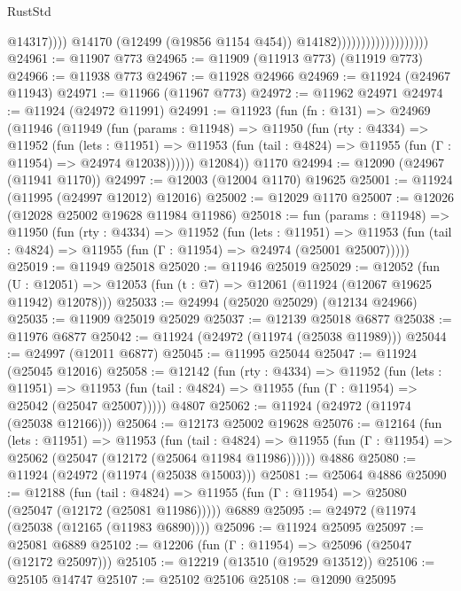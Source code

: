 \begin{lexlean}{RustStd}
\begin{coremodule}
                                                  @14317))))
                                          @14170
                                          (@12499 (@19856 @1154 @454))
                                          @14182)))))))))))))))))))
@24961 := @11907 @773
@24965 := @11909 (@11913 @773) (@11919 @773)
@24966 := @11938 @773
@24967 := @11928 @24966
@24969 := @11924 (@24967 @11943)
@24971 := @11966 (@11967 @773)
@24972 := @11962 @24971
@24974 := @11924 (@24972 @11991)
@24991 := @11923
    (fun (fn : @131) =>
    @24969
      (@11946
        (@11949
          (fun (params : @11948) =>
          @11950
            (fun (rty : @4334) =>
            @11952
              (fun (lets : @11951) =>
              @11953 (fun (tail : @4824) => @11955 (fun (Γ : @11954) => @24974 @12038))))))
        @12084))
    @1170
@24994 := @12090 (@24967 (@11941 @1170))
@24997 := @12003 (@12004 @1170) @19625
@25001 := @11924 (@11995 (@24997 @12012) @12016)
@25002 := @12029 @1170
@25007 := @12026 (@12028 @25002 @19628 @11984 @11986)
@25018 := fun (params : @11948) =>
  @11950
    (fun (rty : @4334) =>
    @11952
      (fun (lets : @11951) =>
      @11953 (fun (tail : @4824) => @11955 (fun (Γ : @11954) => @24974 (@25001 @25007)))))
@25019 := @11949 @25018
@25020 := @11946 @25019
@25029 := @12052
    (fun (U : @12051) => @12053 (fun (t : @7) => @12061 (@11924 (@12067 @19625 @11942) @12078)))
@25033 := @24994 (@25020 @25029) (@12134 @24966)
@25035 := @11909 @25019 @25029
@25037 := @12139 @25018 @6877
@25038 := @11976 @6877
@25042 := @11924 (@24972 (@11974 (@25038 @11989)))
@25044 := @24997 (@12011 @6877)
@25045 := @11995 @25044
@25047 := @11924 (@25045 @12016)
@25058 := @12142
    (fun (rty : @4334) =>
    @11952
      (fun (lets : @11951) =>
      @11953 (fun (tail : @4824) => @11955 (fun (Γ : @11954) => @25042 (@25047 @25007)))))
    @4807
@25062 := @11924 (@24972 (@11974 (@25038 @12166)))
@25064 := @12173 @25002 @19628
@25076 := @12164
    (fun (lets : @11951) =>
    @11953
      (fun (tail : @4824) =>
      @11955 (fun (Γ : @11954) => @25062 (@25047 (@12172 (@25064 @11984 @11986))))))
    @4886
@25080 := @11924 (@24972 (@11974 (@25038 @15003)))
@25081 := @25064 @4886
@25090 := @12188
    (fun (tail : @4824) => @11955 (fun (Γ : @11954) => @25080 (@25047 (@12172 (@25081 @11986)))))
    @6889
@25095 := @24972 (@11974 (@25038 (@12165 (@11983 @6890))))
@25096 := @11924 @25095
@25097 := @25081 @6889
@25102 := @12206 (fun (Γ : @11954) => @25096 (@25047 (@12172 @25097)))
@25105 := @12219 (@13510 (@19529 @13512))
@25106 := @25105 @14747
@25107 := @25102 @25106
@25108 := @12090 @25095

\end{coremodule}
\end{lexlean}
